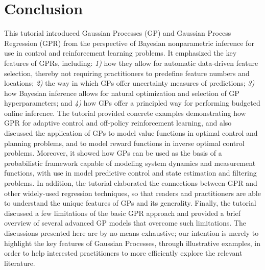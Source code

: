 \section{Conclusion}
This tutorial introduced Gaussian Processes (GP) and Gaussian Process Regression (GPR) from the perspective of Bayesian nonparametric inference for use in control and reinforcement learning problems. It emphasized the key features of GPRs, including: \emph{1)} how they allow for automatic data-driven feature selection, thereby not requiring practitioners to predefine feature numbers and locations; \emph{2)} the way in which GPs offer uncertainty measures of predictions; \emph{3)} how Bayesian inference allows for natural optimization and selection of GP hyperparameters; and \emph{4)} how GPs offer a principled way for performing budgeted online inference. The tutorial provided concrete examples demonstrating how GPR for adaptive control and off-policy reinforcement learning, and also discussed the application of GPs to model value functions in optimal control and planning problems, and to model reward functions in inverse optimal control problems. Moreover, it showed how GPs can be used as the basis of a probabilistic framework capable of modeling system dynamics and measurement functions, with use in model predictive control and state estimation and filtering problems. In addition, the tutorial elaborated the connections between GPR and other widely-used regression techniques, so that  readers and practitioners are able to understand the unique features of GPs and its generality. Finally, the tutorial discussed a few limitations of the basic GPR approach and provided a brief overview of several advanced GP models that overcome such limitations. The discussions presented here are by no means exhaustive; our intention is merely to highlight the key features of Gaussian Processes, through illustrative examples, in order to help interested practitioners to more efficiently explore the relevant literature.

